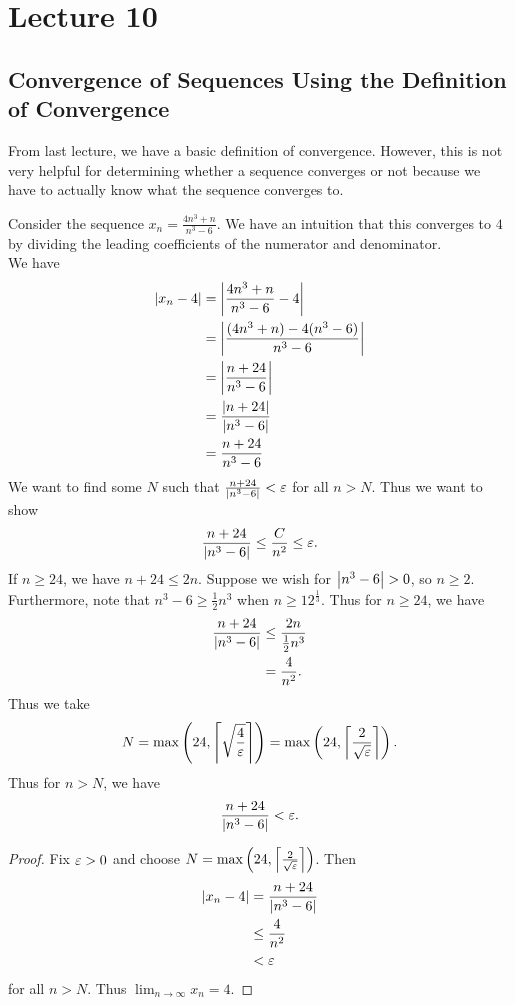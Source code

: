 \documentclass[class=article, crop=false]{standalone}
\begin{document}
  \section{Lecture 10}
  \subsection{Convergence of Sequences Using the Definition of Convergence}
  From last lecture, we have a basic definition of convergence. However, this is not very helpful for determining whether a sequence converges or not because we have to actually know what the sequence converges to.
  \begin{example}{}
    Consider the sequence $x_n = \frac{4n^3 + n}{n^3 - 6}$. We have an intuition that this converges to $4$ by dividing the leading coefficients of the numerator and denominator. \\[10pt]
    We have
    \begin{align*}
      \left\lvert x_n - 4 \right\rvert &= \left\lvert \frac{4n^3 + n}{n^3 - 6} - 4 \right\rvert \\
                    &= \left\lvert \frac{(4n^3 + n) - 4(n^3 - 6)}{n^3 - 6} \right\rvert \\
                    &= \left\lvert \frac{n + 24}{n^3 - 6} \right\rvert \\
                    &= \frac{\left\lvert n + 24 \right\rvert}{\left\lvert n^3 - 6 \right\rvert} \\
                    &= \frac{n + 24}{n^3 - 6}
    \end{align*}
    We want to find some $N$ such that $\frac{n+24}{\left\lvert n^3 - 6 \right\rvert} < \varepsilon$ for all $n > N$. Thus we want to show
    \[
      \frac{n+24}{\left\lvert n^3 - 6 \right\rvert}\leq \frac{C}{n^2}\leq \varepsilon.
    \]
    If $n\geq 24$, we have $n + 24\leq 2n$. Suppose we wish for $\left\lvert n^3 - 6 \right\rvert > 0$, so $n \geq 2$. Furthermore, note that $n^3 - 6 \geq \frac{1}{2}n^3$ when $n\geq 12^{\frac{1}{3}}$. Thus for $n\geq 24$, we have
    \begin{align*}
      \frac{n + 24}{\left\lvert n^3 -6 \right\rvert} &\leq \frac{2n}{\frac{1}{2}n^3} \\
                                  &= \frac{4}{n^2}.
    \end{align*}
    Thus we take 
    \[
      N = \max\left( 24, \left\lceil \sqrt{\frac{4}{\varepsilon}} \right\rceil \right) = \max\left( 24, \left\lceil \frac{2}{\sqrt{\varepsilon}} \right\rceil \right).
    \]
    Thus for $n > N$, we have
    \[
      \frac{n + 24}{\left\lvert n^3 - 6 \right\rvert} < \varepsilon.
    \]
    \begin{proof}
      Fix $\varepsilon > 0$ and choose $N = \max\left( 24, \left\lceil \frac{2}{\sqrt{\varepsilon}} \right\rceil \right)$. Then
      \begin{align*}
        \left\lvert x_n - 4 \right\rvert &= \frac{n + 24}{\left\lvert n^3 - 6 \right\rvert} \\
                      &\leq \frac{4}{n^2} \\
                      &< \varepsilon
      \end{align*}
      for all $n > N$. Thus $\lim_{n\to \infty}x_n = 4$.
    \end{proof}
  \end{example}
\end{document}
